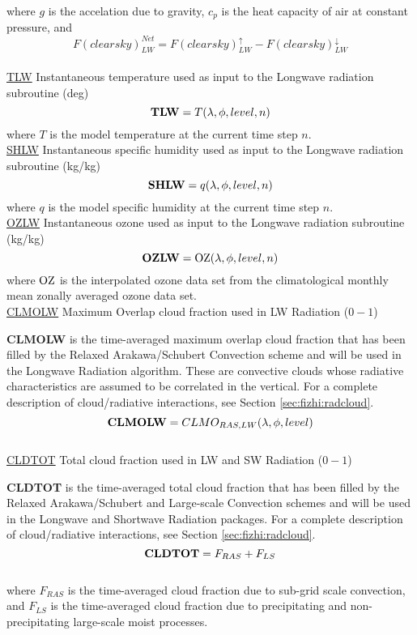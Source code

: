 \noindent
where $g$ is the accelation due to gravity,
$c_p$ is the heat capacity of air at constant pressure,
and
\[
F(clearsky)_{LW}^{Net} = F(clearsky)_{LW}^\uparrow - F(clearsky)_{LW}^\downarrow
\]
\\

 
\noindent
{ \underline {TLW} Instantaneous temperature used as input to the Longwave
 radiation subroutine (deg)}
\[
{\bf TLW}  = T(\lambda , \phi ,level, n)
\]
\noindent
where $T$ is the model temperature at the current time step $n$.
\\
 
 
\noindent
{ \underline {SHLW} Instantaneous specific humidity used as input to
 the Longwave radiation subroutine (kg/kg)}
\[
{\bf SHLW}  = q(\lambda , \phi , level , n)
\]
\noindent
where $q$ is the model specific humidity at the current time step $n$.
\\
 
 
\noindent
{ \underline {OZLW} Instantaneous ozone used as input to
 the Longwave radiation subroutine (kg/kg)}
\[
{\bf OZLW}  = {\rm OZ}(\lambda , \phi , level , n)
\]
\noindent
where $\rm OZ$ is the interpolated ozone data set from the climatological monthly
mean zonally averaged ozone data set.
\\
 

\noindent
{ \underline {CLMOLW} Maximum Overlap cloud fraction used in LW Radiation ($0-1$) }

\noindent
{\bf CLMOLW} is the time-averaged maximum overlap cloud fraction that has been filled by the Relaxed
Arakawa/Schubert Convection scheme and will be used in the Longwave Radiation algorithm.  These are
convective clouds whose radiative characteristics are assumed to be correlated in the vertical.
For a complete description of cloud/radiative interactions, see Section \ref{sec:fizhi:radcloud}.
\[
{\bf CLMOLW} = CLMO_{RAS,LW}(\lambda, \phi,  level )
\]
\\
 

{ \underline {CLDTOT} Total cloud fraction used in LW and SW Radiation ($0-1$) }

{\bf CLDTOT} is the time-averaged total cloud fraction that has been filled by the Relaxed
Arakawa/Schubert and Large-scale Convection schemes and will be used in the Longwave and Shortwave
Radiation packages.
For a complete description of cloud/radiative interactions, see Section \ref{sec:fizhi:radcloud}.
\[
{\bf CLDTOT} = F_{RAS} + F_{LS}
\]
\\
where $F_{RAS}$ is the time-averaged cloud fraction due to sub-grid scale convection, and $F_{LS}$ is the
time-averaged cloud fraction due to precipitating and non-precipitating large-scale moist processes.
\\


